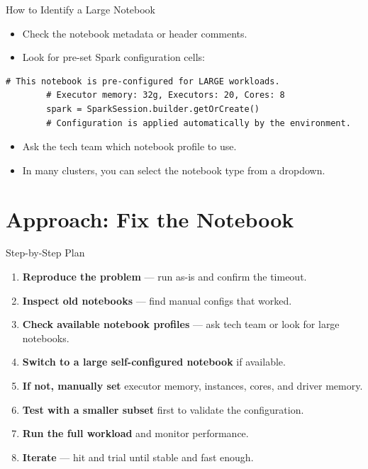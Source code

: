 \documentclass[aspectratio=169]{beamer}
\begin{document}
\begin{frame}[fragile]{How to Identify a Large Notebook}
	\begin{itemize}
		\item Check the notebook metadata or header comments.
		\item Look for pre-set Spark configuration cells:
	\end{itemize}
	
	\begin{lstlisting}[style=sparkstyle, caption={Self-configured large notebook (example)}]
		# This notebook is pre-configured for LARGE workloads.
		# Executor memory: 32g, Executors: 20, Cores: 8
		spark = SparkSession.builder.getOrCreate()
		# Configuration is applied automatically by the environment.
	\end{lstlisting}
	
	\begin{itemize}
		\item Ask the tech team which notebook profile to use.
		\item In many clusters, you can select the notebook type from a dropdown.
	\end{itemize}
\end{frame} 


	\section{Approach: Fix the Notebook}
	
	\begin{frame}{Step-by-Step Plan}
		\begin{enumerate}
			\item \textbf{Reproduce the problem} --- run as-is and confirm the timeout.
			\item \textbf{Inspect old notebooks} --- find manual configs that worked.
			\item \textbf{Check available notebook profiles} --- ask tech team or look for large notebooks.
			\item \textbf{Switch to a large self-configured notebook} if available.
			\item \textbf{If not, manually set} executor memory, instances, cores, and driver memory.
			\item \textbf{Test with a smaller subset} first to validate the configuration.
			\item \textbf{Run the full workload} and monitor performance.
			\item \textbf{Iterate} --- hit and trial until stable and fast enough.
		\end{enumerate}
	\end{frame}
	
\end{document}
